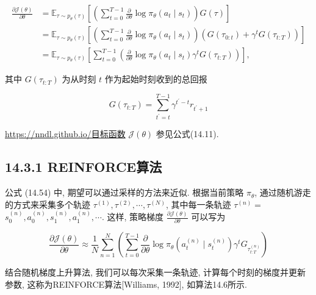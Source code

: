 \documentclass[10pt]{article}
\begin{document}
\begin{align*}
\frac{\partial \mathcal{J}(\theta)}{\partial \theta} & =\mathbb{E}_{\tau \sim p_{\theta}(\tau)}\left[\left(\sum_{t=0}^{T-1} \frac{\partial}{\partial \theta} \log \pi_{\theta}\left(a_{t} \mid s_{t}\right)\right) G(\tau)\right]  \tag{14.52}\\
& =\mathbb{E}_{\tau \sim p_{\theta}(\tau)}\left[\left(\sum_{t=0}^{T-1} \frac{\partial}{\partial \theta} \log \pi_{\theta}\left(a_{t} \mid s_{t}\right)\right)\left(G\left(\tau_{0: t}\right)+\gamma^{t} G\left(\tau_{t: T}\right)\right)\right]  \tag{14.53}\\
& =\mathbb{E}_{\tau \sim p_{\theta}(\tau)}\left[\sum_{t=0}^{T-1}\left(\frac{\partial}{\partial \theta} \log \pi_{\theta}\left(a_{t} \mid s_{t}\right) \gamma^{t} G\left(\tau_{t: T}\right)\right)\right], \tag{14.54}
\end{align*}


其中 $G\left(\tau_{t: T}\right)$ 为从时刻 $t$ 作为起始时刻收到的总回报


\begin{equation*}
G\left(\tau_{t: T}\right)=\sum_{t^{\prime}=t}^{T-1} \gamma^{t^{\prime}-t} r_{t^{\prime}+1} \tag{14.55}
\end{equation*}


\href{https://nndl.github.io/%E7%9B%AE%E6%A0%87%E5%87%BD%E6%95%B0}{https://nndl.github.io/目标函数} $\mathcal{J}(\theta)$ 参见公式(14.11).

\subsection*{14.3.1 REINFORCE算法}
公式 (14.54) 中, 期望可以通过采样的方法来近似. 根据当前策略 $\pi_{\theta}$, 通过随机游走的方式来采集多个轨迹 $\tau^{(1)}, \tau^{(2)}, \cdots, \tau^{(N)}$, 其中每一条轨迹 $\tau^{(n)}=$ $s_{0}^{(n)}, a_{0}^{(n)}, s_{1}^{(n)}, a_{1}^{(n)}, \cdots$. 这样, 策略梯度 $\frac{\partial \mathcal{J}(\theta)}{\partial \theta}$ 可以写为


\begin{equation*}
\frac{\partial \mathcal{J}(\theta)}{\partial \theta} \approx \frac{1}{N} \sum_{n=1}^{N}\left(\sum_{t=0}^{T-1} \frac{\partial}{\partial \theta} \log \pi_{\theta}\left(a_{t}^{(n)} \mid s_{t}^{(n)}\right) \gamma^{t} G_{\tau_{t: T}^{(n)}}\right) \tag{14.56}
\end{equation*}


结合随机梯度上升算法, 我们可以每次采集一条轨迹, 计算每个时刻的梯度并更新参数, 这称为REINFORCE算法[Williams, 1992], 如算法14.6所示.
\end{document}

